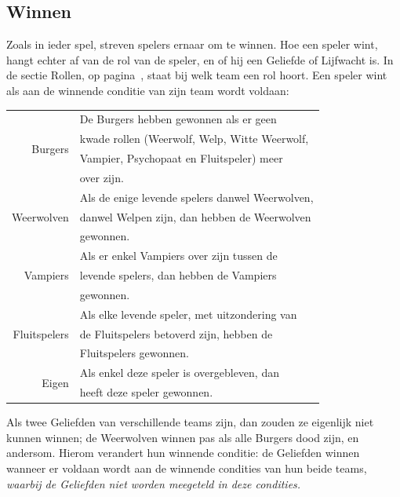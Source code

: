 \documentclass[12pt]{article}
\begin{document}
  \subsection{Winnen} \label{subsec:winnen}
  
    Zoals in ieder spel, streven spelers ernaar om te winnen. Hoe een speler wint, hangt echter af van de rol van de speler, en of hij een Geliefde of Lijfwacht is. In de sectie Rollen, op pagina~\pageref{subsec:rollen}, staat bij welk team een rol hoort. Een speler wint als aan de winnende conditie van zijn team wordt voldaan:
    
    \begin{center}
      \begin{tabular}{r|l}
        \multirow{4}{*}{Burgers}
         & De Burgers hebben gewonnen als er geen \\
         & kwade rollen (Weerwolf, Welp, Witte Weerwolf, \\
         & Vampier, Psychopaat en Fluitspeler) meer \\
         & over zijn. \\
        \hline
        \multirow{3}{*}{Weerwolven}
         & Als de enige levende spelers danwel Weerwolven, \\
         & danwel Welpen zijn, dan hebben de Weerwolven \\
         & gewonnen. \\
        \hline
        \multirow{3}{*}{Vampiers}
         & Als er enkel Vampiers over zijn tussen de \\
         & levende spelers, dan hebben de Vampiers \\
         & gewonnen. \\
        \hline
        \multirow{3}{*}{Fluitspelers}
         & Als elke levende speler, met uitzondering van \\
         & de Fluitspelers betoverd zijn, hebben de \\
         & Fluitspelers gewonnen. \\
        \hline
        \multirow{2}{*}{Eigen} 
         & Als enkel deze speler is overgebleven, dan \\
         & heeft deze speler gewonnen. \\
      \end{tabular}
    \end{center}
    
    Als twee Geliefden van verschillende teams zijn, dan zouden ze eigenlijk niet kunnen winnen; de Weerwolven winnen pas als alle Burgers dood zijn, en andersom. Hierom verandert hun winnende conditie: de Geliefden winnen wanneer er voldaan wordt aan de winnende condities van hun beide teams, \emph{waarbij de Geliefden niet worden meegeteld in deze condities.}
    
\end{document}
